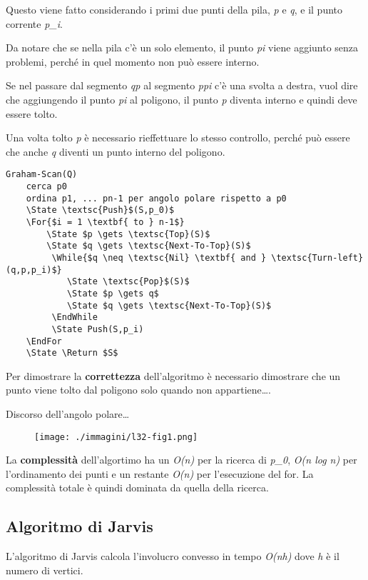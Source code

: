 Questo viene fatto considerando i primi due punti della pila, \emph{p} e
\emph{q}, e il punto corrente \emph{p\_i}.

Da notare che se nella pila c'è un solo elemento, il punto \emph{pi}
viene aggiunto senza problemi, perché in quel momento non può essere
interno.

Se nel passare dal segmento \emph{qp} al segmento \emph{ppi} c'è una
svolta a destra, vuol dire che aggiungendo il punto \emph{pi} al
poligono, il punto \emph{p} diventa interno e quindi deve essere tolto.

Una volta tolto \emph{p} è necessario rieffettuare lo stesso controllo,
perché può essere che anche \emph{q} diventi un punto interno del
poligono.

\begin{verbatim}
Graham-Scan(Q)
    cerca p0
    ordina p1, ... pn-1 per angolo polare rispetto a p0
    \State \textsc{Push}$(S,p_0)$
    \For{$i = 1 \textbf{ to } n-1$}
        \State $p \gets \textsc{Top}(S)$
        \State $q \gets \textsc{Next-To-Top}(S)$
         \While{$q \neq \textsc{Nil} \textbf{ and } \textsc{Turn-left}(q,p,p_i)$}
            \State \textsc{Pop}$(S)$
            \State $p \gets q$
            \State $q \gets \textsc{Next-To-Top}(S)$
         \EndWhile
         \State Push(S,p_i)
    \EndFor
    \State \Return $S$
\end{verbatim}

Per dimostrare la \textbf{correttezza} dell'algoritmo è necessario
dimostrare che un punto viene tolto dal poligono solo quando non
appartiene\ldots{}.

Discorso dell'angolo polare\ldots{}

\begin{figure}[htbp]
\centering
\texttt{[image: ./immagini/l32-fig1.png]}
\caption{}
\end{figure}

La \textbf{complessità} dell'algortimo ha un \emph{O(n)} per la ricerca
di \emph{p\_0}, \emph{O(n log n)} per l'ordinamento dei punti e un
restante \emph{O(n)} per l'esecuzione del for. La complessità totale è
quindi dominata da quella della ricerca.

\subsection{Algoritmo di Jarvis}\label{algoritmo-di-jarvis}

L'algoritmo di Jarvis calcola l'involucro convesso in tempo \emph{O(nh)}
dove \emph{h} è il numero di vertici.


